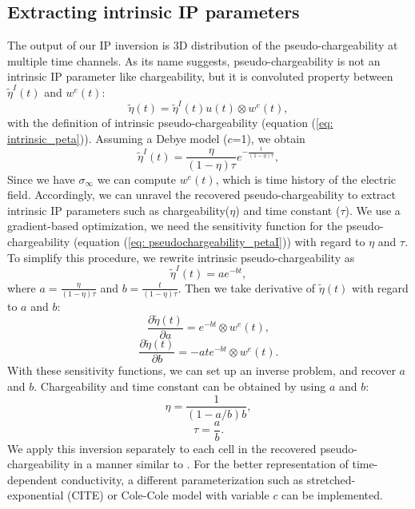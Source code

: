 \documentclass[a4paper, 11pt]{article}
\newcommand{\siginf}{\sigma_\infty}
\newcommand{\peta}{\tilde{\eta}}
\begin{document}
\subsection{Extracting intrinsic IP parameters}
\label{section: extract_intrinsicIP}
The output of our IP inversion is 3D distribution of the pseudo-chargeability at multiple time channels. 
As its name suggests, pseudo-chargeability is not an intrinsic IP parameter like chargeability, but it is convoluted property between $\peta^{I}(t)$ and $w^{e}(t)$:
\begin{equation}
  \peta(t) = \peta^{I}(t)u(t) \otimes w^e(t),
  \label{eq: pseudochargeability_petaI}
\end{equation}
with the definition of intrinsic pseudo-chargeability (equation (\ref{eq: intrinsic_peta})).
Assuming a Debye model ($c$=1), we obtain
\begin{equation}
    \peta^{I}(t) = \frac{\eta}{(1-\eta)\tau}e^{-\frac{t}{(1-\eta)\tau}},
    \label{eq: intrinsic_peta_debye}
\end{equation}
Since we have $\siginf$ we can compute $w^e(t)$, which is time history of the electric field. 
Accordingly, we can unravel the recovered pseudo-chargeability to extract intrinsic IP parameters such as chargeability($\eta$) and time constant ($\tau$). 
We use a gradient-based optimization, we need the sensitivity function for the pseudo-chargeability (equation (\ref{eq: pseudochargeability_petaI})) with regard to $\eta$ and $\tau$. 
To simplify this procedure, we rewrite intrinsic pseudo-chargeability as 
\begin{equation}
  \peta^{I}(t) = a e^{-bt},
\end{equation}
where $a = \frac{\eta}{(1-\eta)\tau}$ and $b = \frac{t}{(1-\eta)\tau}$. 
Then we take derivative of $\peta(t)$ with regard to $a$ and $b$:
\begin{equation}
  \frac{\partial \peta(t)}{\partial a} = e^{-bt} \otimes w^e(t),
\end{equation}
\begin{equation}
  \frac{\partial \peta(t)}{\partial b} = -ate^{-bt} \otimes w^e(t).
\end{equation}
With these sensitivity functions, we can set up an inverse problem, and recover $a$ and $b$. 
Chargeability and time constant can be obtained by using $a$ and $b$:
\begin{equation}
  \eta =  \frac{1}{(1-a/b)b},
\end{equation}
\begin{equation}
  \tau =  \frac{a}{b}.
\end{equation}
We apply this inversion separately to each cell in the recovered pseudo-chargeability  in a manner similar to \cite[]{Yuval1997}.
For the better representation of time-dependent conductivity, a different parameterization such as stretched-exponential (CITE) or Cole-Cole model with variable $c$ can be implemented. 
\end{document}
